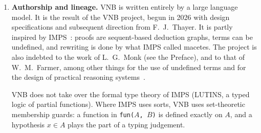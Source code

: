 \begin{enumerate}
\item \textbf{Authorship and lineage.}  VNB is written entirely by a large
  language model.  It is the result of the VNB project, begun in 2026
  with design specifications and subsequent direction from
  F.~J.~Thayer.  It is partly inspired by IMPS~\cite{IMPS}: proofs are
  sequent-based deduction graphs, terms can be undefined, and rewriting
  is done by what IMPS called macetes.  The project is also indebted to
  the work of L.~G.~Monk (see the Preface), and to that
  of W.~M.~Farmer, among other things for the use of undefined terms and
  for the design of practical reasoning systems~\cite{Farmer2023}.

  VNB does not take over the formal type theory of IMPS (LUTINS, a typed logic of partial
  functions).  Where IMPS uses sorts, VNB uses set-theoretic membership
  guards: a function in \texttt{fun($A$, $B$)} is defined exactly on $A$,
  and a hypothesis $x \in A$ plays the part of a typing judgement.


\end{enumerate}
